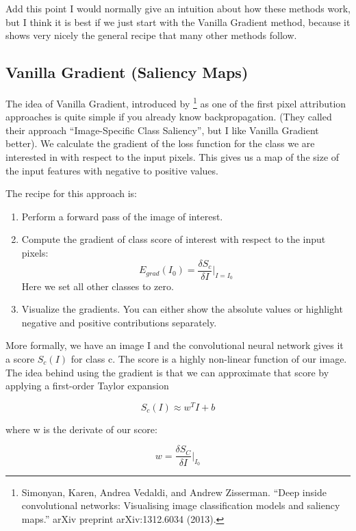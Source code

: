 \documentclass[
  12pt,
]{krantz}
\providecommand{\tightlist}{%
  \setlength{\itemsep}{0pt}\setlength{\parskip}{0pt}}
\begin{document}
Add this point I would normally give an intuition about how these methods work, but I think it is best if we just start with the Vanilla Gradient method, because it shows very nicely the general recipe that many other methods follow.

\hypertarget{vanilla-gradient-saliency-maps}{%
\subsection{Vanilla Gradient (Saliency Maps)}\label{vanilla-gradient-saliency-maps}}

The idea of Vanilla Gradient, introduced by \footnote{Simonyan, Karen, Andrea Vedaldi, and Andrew Zisserman. ``Deep inside convolutional networks: Visualising image classification models and saliency maps.'' arXiv preprint arXiv:1312.6034 (2013).} as one of the first pixel attribution approaches is quite simple if you already know backpropagation.
(They called their approach ``Image-Specific Class Saliency'', but I like Vanilla Gradient better).
We calculate the gradient of the loss function for the class we are interested in with respect to the input pixels.
This gives us a map of the size of the input features with negative to positive values.

The recipe for this approach is:

\begin{enumerate}
\def\labelenumi{\arabic{enumi}.}
\tightlist
\item
  Perform a forward pass of the image of interest.
\item
  Compute the gradient of class score of interest with respect to the input pixels:
  \[E_{grad}(I_0)=\frac{\delta{}S_c}{\delta{}I}|_{I=I_0}\]
  Here we set all other classes to zero.
\item
  Visualize the gradients. You can either show the absolute values or highlight negative and positive contributions separately.
\end{enumerate}

More formally, we have an image I and the convolutional neural network gives it a score \(S_c(I)\) for class c.
The score is a highly non-linear function of our image.
The idea behind using the gradient is that we can approximate that score by applying a first-order Taylor expansion

\[S_c(I)\approx{}w^T{}I+b\]

where w is the derivate of our score:

\[w = \frac{\delta S_C}{\delta I}|_{I_0}\]
\end{document}
